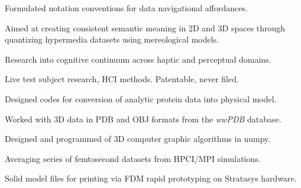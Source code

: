 \documentclass[letterpaper]{deedy-resume} %
\begin{document}
\begin{minipage}[t]{1\textwidth}
\sectionspace %



\begin{tightitemize}
\item Formulated notation conventions for data navigational affordances.
\item Aimed at creating consistent semantic meaning in 2D and 3D spaces through quantizing hypermedia datasets using mereological models.
\item Research into cognitive continuum across haptic and perceptual domains.  
\item Live test subject research, HCI methods.  Patentable, never filed.
\end{tightitemize}

\sectionspace %




\begin{tightitemize}
\item Designed codes for conversion of analytic protein data into physical model.
\item Worked with 3D data in PDB and OBJ formats from the \textit{wwPDB} database.
\item Designed and programmed of 3D computer graphic algorithms in numpy.
\item Averaging series of femtosecond datasets from HPCI/MPI simulations.
\item Solid model files for printing via FDM rapid prototyping on Stratasys hardware.
\end{tightitemize}

\sectionspace %





\end{minipage} %

\end{document}

